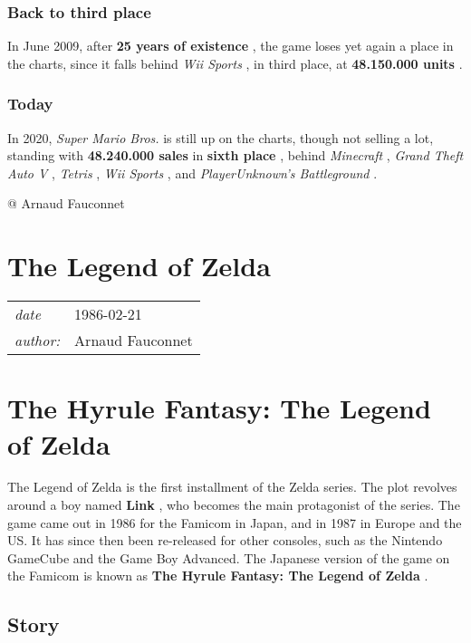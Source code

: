 \documentclass[a4paper,10pt]{book}
\newcommand{\pageHeader}[4]{
    \section{#1}
    \vspace{-0.3cm}
    \begin{table}[h!]
     \begin{tabular}{ll}
        \hline
        \textit{date} & #2 \\
        \textit{author: } & #3\\
        \hline
     \end{tabular}
    \end{table}
    \vspace{-0.3cm}
}
\begin{document}
 \subsubsection{Back to third place }  In
          June 2009, after  \textbf{25 years of existence } , the game loses yet
          again a place in the charts, since it falls behind  \textit{Wii Sports },
          in third place, at  \textbf{48.150.000 units } . 
 \subsubsection{Today }
  In
          2020,  \textit{Super Mario Bros. } is still up on the charts, though
          not selling a lot, standing with  \textbf{48.240.000 sales }  in
           \textbf{sixth place } , behind  \textit{Minecraft },  \textit{Grand Theft
          Auto V },  \textit{Tetris },  \textit{Wii Sports }, and  \textit{PlayerUnknown's
          Battleground }.
           
 
 @ Arnaud Fauconnet 
 
 \newpage\pageHeader{The Legend of Zelda}{1986-02-21}{Arnaud Fauconnet}{The first episode of a huge video game series}
 \section{The Hyrule Fantasy: The Legend of Zelda }
 
 
              The Legend of Zelda is the first installment of the Zelda series. 
              The plot revolves around a boy named  \textbf{Link } , who becomes the main protagonist of the series.
              The game came out in 1986 for the Famicom in Japan, and in 1987 in Europe and the US.
              It has since then been re-released for other consoles, such as the Nintendo GameCube and the Game Boy Advanced.
              The Japanese version of the game on the Famicom is known as  \textbf{The Hyrule Fantasy: The Legend of Zelda } .
               
 \subsection{Story }
 
\end{document}
